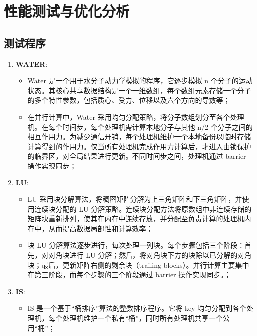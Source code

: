 \chapter{性能测试与优化分析}\label{chap:experiments}{
    \section{测试程序}


    \begin{enumerate}[leftmargin=1em, align=left]
        \item \textbf{WATER}:
              \begin{itemize}[leftmargin=*, nosep]
                  \item Water 是一个用于水分子动力学模拟的程序，它逐步模拟 n 个分子的运动状态。其核心共享数据结构是一个一维数组，每个数组元素存储一个分子的多个特性参数，包括质心、受力、位移以及六个方向的导数等；
                  \item 在并行计算中，Water 采用均匀分配策略，将分子数组划分至各个处理机。在每个时间步，每个处理机需计算本地分子与其他 n/2 个分子之间的相互作用力。为减少通信开销，每个处理机维护一个本地备份以临时存储计算得到的作用力。仅当所有处理机完成作用力计算后，才进入由锁保护的临界区，对全局结果进行更新。不同时间步之间，处理机通过 barrier 操作实现同步；
              \end{itemize}
        \item \textbf{LU}:
              \begin{itemize}[leftmargin=*, nosep]
                  \item LU 采用块分解算法，将稠密矩阵分解为上三角矩阵和下三角矩阵，并使用连续块分配的 LU 分解策略。连续块分配方法将原数组中非连续存储的矩阵块重新排列，使其在内存中连续存放，并分配至负责计算的处理机内存中，从而提高数据局部性和计算效率；
                  \item 块 LU 分解算法逐步进行，每次处理一列块。每个步骤包括三个阶段：首先，对对角块进行 LU 分解；然后，将对角块下方的块除以已分解的对角块；最后，更新矩阵右侧的剩余块（trailing blocks）。并行计算主要集中在第三阶段，而每个步骤的三个阶段通过 barrier 操作实现同步。；
              \end{itemize}
        \item \textbf{IS}:
              \begin{itemize}[leftmargin=*, nosep]
                  \item IS 是一个基于“桶排序”算法的整数排序程序。它将 key 均匀分配到各个处理机，每个处理机维护一个私有“桶”，同时所有处理机共享一个公用“桶”；

\end{itemize}
\end{enumerate}}
